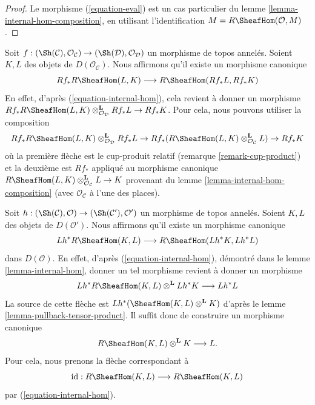 \begin{proof}
Le morphisme (\ref{equation-eval}) est un cas particulier du
lemme \ref{lemma-internal-hom-composition}, en utilisant l'identification
$M = R\SheafHom(\mathcal{O}, M)$.
\end{proof}

\begin{remark}
\label{remark-projection-formula-for-internal-hom}
Soit $f : (\Sh(\mathcal{C}), \mathcal{O}_\mathcal{C}) \to
(\Sh(\mathcal{D}), \mathcal{O}_\mathcal{D})$ un morphisme de topos annelés.
Soient $K, L$ des objets de $D(\mathcal{O}_\mathcal{C})$. Nous affirmons
qu'il existe un morphisme canonique
$$
Rf_*R\SheafHom(L, K) \longrightarrow R\SheafHom(Rf_*L, Rf_*K)
$$
En effet, d'après (\ref{equation-internal-hom}), cela revient à donner un
morphisme
$Rf_*R\SheafHom(L, K) \otimes_{\mathcal{O}_\mathcal{D}}^\mathbf{L} Rf_*L
\to Rf_*K$.
Pour cela, nous pouvons utiliser la composition
$$
Rf_*R\SheafHom(L, K) \otimes_{\mathcal{O}_\mathcal{D}}^\mathbf{L} Rf_*L \to
Rf_*(R\SheafHom(L, K) \otimes_{\mathcal{O}_\mathcal{C}}^\mathbf{L} L) \to
Rf_*K
$$
où la première flèche est le cup-produit relatif
(remarque \ref{remark-cup-product}) et la deuxième est $Rf_*$ appliqué au
morphisme canonique
$R\SheafHom(L, K) \otimes_{\mathcal{O}_\mathcal{C}}^\mathbf{L} L \to K$
provenant du lemme \ref{lemma-internal-hom-composition}
(avec $\mathcal{O}_\mathcal{C}$ à l'une des places).
\end{remark}

\begin{remark}
\label{remark-prepare-fancy-base-change}
Soit $h : (\Sh(\mathcal{C}), \mathcal{O}) \to
(\Sh(\mathcal{C}'), \mathcal{O}')$ un morphisme de topos annelés.
Soient $K, L$ des objets de $D(\mathcal{O}')$. Nous affirmons qu'il existe
un morphisme canonique
$$
Lh^*R\SheafHom(K, L) \longrightarrow R\SheafHom(Lh^*K, Lh^*L)
$$
dans $D(\mathcal{O})$. En effet, d'après (\ref{equation-internal-hom}),
démontré dans le lemme \ref{lemma-internal-hom}, donner un tel morphisme
revient à donner un morphisme
$$
Lh^*R\SheafHom(K, L) \otimes^\mathbf{L} Lh^*K \longrightarrow Lh^*L
$$
La source de cette flèche est
$Lh^*(\SheafHom(K, L) \otimes^\mathbf{L} K)$ d'après le
lemme \ref{lemma-pullback-tensor-product}. Il suffit donc de construire un
morphisme canonique
$$
R\SheafHom(K, L) \otimes^\mathbf{L} K \longrightarrow L.
$$
Pour cela, nous prenons la flèche correspondant à
$$
\text{id} :
R\SheafHom(K, L)
\longrightarrow
R\SheafHom(K, L)
$$
par (\ref{equation-internal-hom}).
\end{remark}

